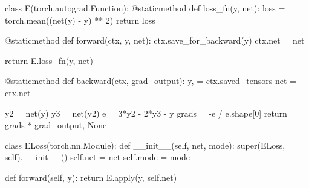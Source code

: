 \begin{python}
class E(torch.autograd.Function):
    @staticmethod
    def loss_fn(y, net):
        loss = torch.mean((net(y) - y) ** 2)
        return loss

    @staticmethod
    def forward(ctx, y, net):
        ctx.save_for_backward(y)
        ctx.net = net

        return E.loss_fn(y, net)

    @staticmethod
    def backward(ctx, grad_output):
        y, = ctx.saved_tensors
        net = ctx.net

        y2 = net(y)
        y3 = net(y2)
        e = 3*y2 - 2*y3 - y
        grads = -e / e.shape[0]
        return grads * grad_output, None

class ELoss(torch.nn.Module):
    def __init__(self, net, mode):
        super(ELoss, self).__init__()
        self.net = net
        self.mode = mode

    def forward(self, y):
        return E.apply(y, self.net)
\end{python}